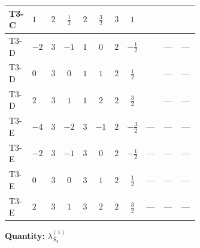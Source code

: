 \documentclass[8pt]{article}
\begin{document}
\begin{landscape}
\begin{longtable}{@{}llcccccc >{\raggedright\arraybackslash}p{0.21\linewidth} >{\raggedright\arraybackslash}p{0.21\linewidth} >{\raggedright\arraybackslash}p{0.21\linewidth}@{}}
\midrule
T3-C & $1$ & $2$ & $\frac{1}{2}$ & $2$ & $\frac{3}{2}$ & $3$ & $1$ & \scriptsize\adjustbox{max width=\linewidth}{$\begin{gathered} 6 {\lambda_{S_2}^{(1)}} T_{\nu}^{(2)}\end{gathered}$} & \scriptsize\adjustbox{max width=\linewidth}{$\begin{gathered} +\frac{9 {g_2}^4}{4}\end{gathered}$} & \scriptsize\adjustbox{max width=\linewidth}{$\begin{gathered} +{g_1}^2 \left(\frac{27 {g_2}^2}{2}-27 {\lambda_{S_2}^{(1)}}\right)\end{gathered}$} \\
\midrule
T3-D & $-2$ & $3$ & $-1$ & $1$ & $0$ & $2$ & $-\frac{1}{2}$ & \scriptsize\adjustbox{max width=\linewidth}{$\begin{gathered} 8 {\lambda_{S_2}^{(1)}} T_{\nu}^{(2)}\end{gathered}$} & --- & --- \\
\midrule
T3-D & $0$ & $3$ & $0$ & $1$ & $1$ & $2$ & $\frac{1}{2}$ & \scriptsize\adjustbox{max width=\linewidth}{$\begin{gathered} 8 {\lambda_{S_2}^{(1)}} T_{\nu}^{(2)}\end{gathered}$} & --- & --- \\
\midrule
T3-D & $2$ & $3$ & $1$ & $1$ & $2$ & $2$ & $\frac{3}{2}$ & \scriptsize\adjustbox{max width=\linewidth}{$\begin{gathered} 8 {\lambda_{S_2}^{(1)}} T_{\nu}^{(2)}\end{gathered}$} & --- & --- \\
\midrule
T3-E & $-4$ & $3$ & $-2$ & $3$ & $-1$ & $2$ & $-\frac{3}{2}$ & --- & --- & --- \\
\midrule
T3-E & $-2$ & $3$ & $-1$ & $3$ & $0$ & $2$ & $-\frac{1}{2}$ & --- & --- & --- \\
\midrule
T3-E & $0$ & $3$ & $0$ & $3$ & $1$ & $2$ & $\frac{1}{2}$ & --- & --- & --- \\
\midrule
T3-E & $2$ & $3$ & $1$ & $3$ & $2$ & $2$ & $\frac{3}{2}$ & --- & --- & --- \\
\midrule
\bottomrule
\end{longtable}
\clearpage
\noindent\textbf{Quantity: }$\lambda_{S_2}^{(1)}$\par\smallskip

\end{landscape}
\end{document}
